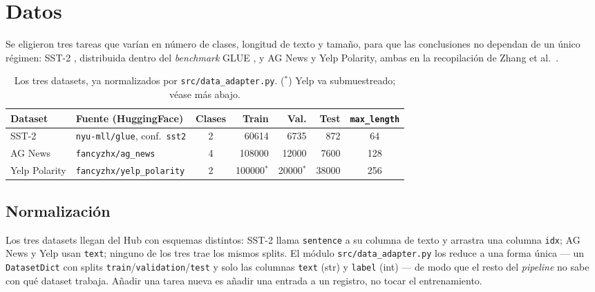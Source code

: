 \section{Datos}
\label{sec:datos}

Se eligieron tres tareas que varían en número de clases, longitud de texto y
tamaño, para que las conclusiones no dependan de un único régimen: SST-2
\cite{socher2013sst}, distribuida dentro del \textit{benchmark} GLUE
\cite{wang2019glue}, y AG News y Yelp Polarity, ambas en la recopilación de
Zhang et al.\ \cite{zhang2015character}.

\begin{table}[h]
\centering
\small
\begin{tabular}{llcrrrc}
\toprule
\textbf{Dataset} & \textbf{Fuente (HuggingFace)} & \textbf{Clases} &
\textbf{Train} & \textbf{Val.} & \textbf{Test} & \textbf{\texttt{max\_length}} \\
\midrule
SST-2          & \texttt{nyu-mll/glue}, conf.\ \texttt{sst2} & 2 & \num{60614}  & \num{6735}  & \num{872}   & 64  \\
AG News        & \texttt{fancyzhx/ag\_news}                  & 4 & \num{108000} & \num{12000} & \num{7600}  & 128 \\
Yelp Polarity  & \texttt{fancyzhx/yelp\_polarity}            & 2 & \num{100000}$^{*}$ & \num{20000}$^{*}$ & \num{38000} & 256 \\
\bottomrule
\end{tabular}
\caption{Los tres datasets, ya normalizados por \texttt{src/data\_adapter.py}.
($^{*}$) Yelp va submuestreado; véase más abajo.}
\end{table}

\subsection{Normalización}

Los tres datasets llegan del Hub con esquemas distintos: SST-2 llama
\texttt{sentence} a su columna de texto y arrastra una columna \texttt{idx};
AG News y Yelp usan \texttt{text}; ninguno de los tres trae los mismos splits.
El módulo \texttt{src/data\_adapter.py} los reduce a una forma única --- un
\texttt{DatasetDict} con splits \texttt{train}/\texttt{validation}/\texttt{test}
y solo las columnas \texttt{text} (str) y \texttt{label} (int) --- de modo que
el resto del \textit{pipeline} no sabe con qué dataset trabaja. Añadir una
tarea nueva es añadir una entrada a un registro, no tocar el entrenamiento.

